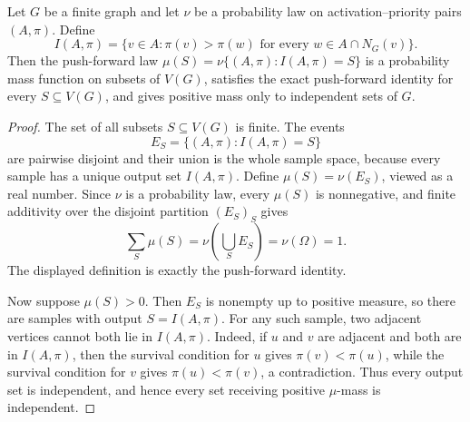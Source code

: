 \begin{lemma}
Let \(G\) be a finite graph and let \(\nu\) be a probability law on
activation--priority pairs \((A,\pi)\).  Define
\[
I(A,\pi)=\{v\in A:\pi(v)>\pi(w)\text{ for every }w\in A\cap N_G(v)\}.
\]
Then the push-forward law \(\mu(S)=\nu\{(A,\pi):I(A,\pi)=S\}\) is a
probability mass function on subsets of \(V(G)\), satisfies the exact
push-forward identity for every \(S\subseteq V(G)\), and gives positive mass
only to independent sets of \(G\).
\end{lemma}
\begin{proof}
The set of all subsets \(S\subseteq V(G)\) is finite.  The events
\[
E_S=\{(A,\pi):I(A,\pi)=S\}
\]
are pairwise disjoint and their union is the whole sample space, because every
sample has a unique output set \(I(A,\pi)\).  Define \(\mu(S)=\nu(E_S)\),
viewed as a real number.  Since \(\nu\) is a probability law, every
\(\mu(S)\) is nonnegative, and finite additivity over the disjoint partition
\((E_S)_S\) gives
\[
\sum_S \mu(S)=\nu\left(\bigcup_S E_S\right)=\nu(\Omega)=1.
\]
The displayed definition is exactly the push-forward identity.

Now suppose \(\mu(S)>0\).  Then \(E_S\) is nonempty up to positive measure, so
there are samples with output \(S=I(A,\pi)\).  For any such sample, two
adjacent vertices cannot both lie in \(I(A,\pi)\).  Indeed, if \(u\) and \(v\)
are adjacent and both are in \(I(A,\pi)\), then the survival condition for
\(u\) gives \(\pi(v)<\pi(u)\), while the survival condition for \(v\) gives
\(\pi(u)<\pi(v)\), a contradiction.  Thus every output set is independent, and
hence every set receiving positive \(\mu\)-mass is independent.
\end{proof}

